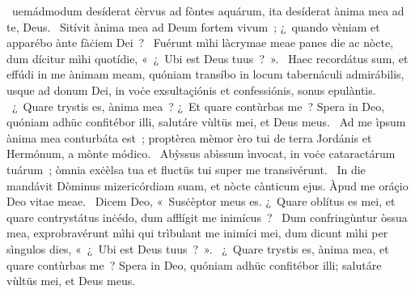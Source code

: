 { }
{%
~uemádmodum desíderat ċèrvus ad fòntes aquárum, ita desíderat ànima mea ad te, Deus. 
~Sitívit ànima mea ad Deum fortem vivum~; ¿~quando vèniam et apparébo ànte fàċiem Dei~? 
~Fuérunt mìhi làcrymae meae panes die ac nòcte, dum dícitur mìhi quotídie, «~¿~Ubi est Deus tuus~?~». 
~Haec recordátus sum, et effúdi in me ànimam meam, quóniam transíbo in locum tabernáculi admirábilis, usque ad donum Dei, in voċe exsultaçiónis et confessiónis, sonus epulàntis. 
~¿~Quare trystis es, ànima mea~? ¿~Et quare contùrbas me~? Spera in Deo, quóniam adhüc confitébor illi, salutáre vùltüs mei, et Deus meus. 
~Ad me ìpsum ànima mea conturbáta est~; proptèrea mèmor èro tui de terra Jordánis et Hermónum, a mònte módico. 
~Abỳssus abìssum ìnvocat, in voċe cataractárum tuárum~; òmnia exċèlsa tua et fluctüs tui super me transivérunt. 
~In die mandávit Dòminus mizericórdiam suam, et nòcte cànticum ejus. Àpud me oráçio Deo vitae meae. 
~Dicem Deo, «~Susċèptor meus es. ¿~Quare oblítus es mei, et quare contrystátus inċédo, dum afflígit me inimícus~? 
~Dum confringùntur òssua mea, exprobravérunt mìhi qui trìbulant me inimíci mei, dum dicunt mìhi per sìngulos dies, «~¿~Ubi est Deus tuus~?~». 
~¿~Quare trystis es, ànima mea, et quare contùrbas me~? Spera in Deo, quóniam adhüc confitébor illi; salutáre vùltüs mei, et Deus meus. 
}
